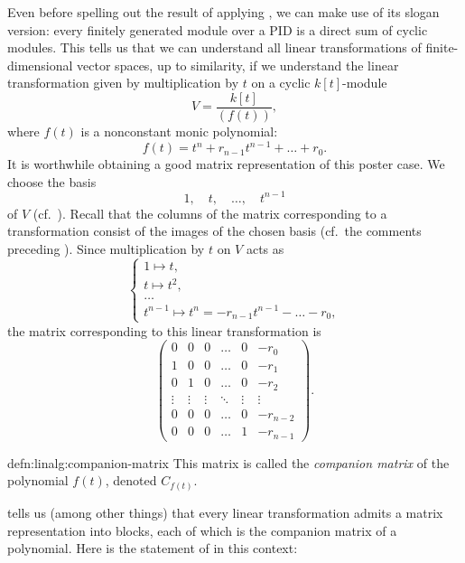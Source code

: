 Even before spelling out the result of applying , we
can make use of its slogan version: every finitely generated module
over a PID is a direct sum of cyclic modules. This tells us that we
can understand all linear transformations of finite-dimensional vector
spaces, up to similarity, if we understand the linear transformation
given by multiplication by $t$ on a cyclic $k[t]$-module
\[
  V = \frac{k[t]}{(f(t))},
\]
where $f(t)$ is a nonconstant monic polynomial:
\[
  f(t) = t^n + r_{n-1} t^{n-1} + \dots + r_0.
\]
It is worthwhile obtaining a good matrix representation of this poster
case. We choose the basis
\[
  1, \quad t, \quad \dots, \quad t^{n-1}
\]
of $V$ (cf.\ ). Recall that the
columns of the matrix corresponding to a transformation consist of the
images of the chosen basis (cf.\ the comments preceding
). Since multiplication by $t$ on $V$ acts as
\[
  \begin{cases}
    1 \mapsto t, \\
    t \mapsto t^2, \\
    \dots \\
    t^{n-1} \mapsto t^n = -r_{n-1} t^{n-1} - \dots - r_0,
  \end{cases}
\]
the matrix corresponding to this linear transformation is
\[
  \begin{pmatrix}
    0 & 0 & 0 & \dots & 0 & -r_0 \\
    1 & 0 & 0 & \dots & 0 & -r_1 \\
    0 & 1 & 0 & \dots & 0 & -r_2 \\
    \vdots & \vdots & \vdots & \ddots & \vdots & \vdots \\
    0 & 0 & 0 & \dots & 0 & -r_{n-2} \\
    0 & 0 & 0 & \dots & 1 & -r_{n-1}
  \end{pmatrix}.
\]

\begin{defn}{}{defn:linalg:companion-matrix}
  This matrix is called the \emph{companion matrix} of the polynomial
  $f(t)$, denoted $C_{f(t)}$.
\end{defn}

 tells us (among other things) that every linear
transformation admits a matrix representation into blocks, each of
which is the companion matrix of a polynomial. Here is the statement
of  in this context:

